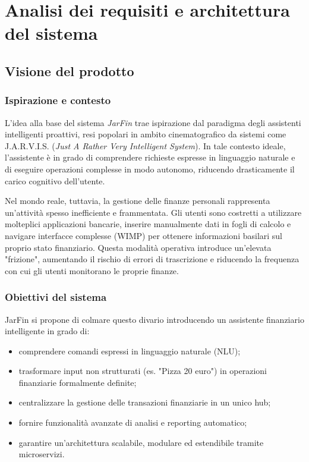 \chapter{Analisi dei requisiti e architettura del sistema}

\section{Visione del prodotto}

\subsection{Ispirazione e contesto}

L'idea alla base del sistema \textit{JarFin} trae ispirazione dal paradigma degli assistenti intelligenti proattivi, resi popolari in ambito cinematografico da sistemi come J.A.R.V.I.S. (\textit{Just A Rather Very Intelligent System}). In tale contesto ideale, l'assistente è in grado di comprendere richieste espresse in linguaggio naturale e di eseguire operazioni complesse in modo autonomo, riducendo drasticamente il carico cognitivo dell'utente.

Nel mondo reale, tuttavia, la gestione delle finanze personali rappresenta un'attività spesso inefficiente e frammentata. Gli utenti sono costretti a utilizzare molteplici applicazioni bancarie, inserire manualmente dati in fogli di calcolo e navigare interfacce complesse (WIMP) per ottenere informazioni basilari sul proprio stato finanziario.
Questa modalità operativa introduce un'elevata "frizione", aumentando il rischio di errori di trascrizione e riducendo la frequenza con cui gli utenti monitorano le proprie finanze.

\newpage
\subsection{Obiettivi del sistema}

JarFin si propone di colmare questo divario introducendo un assistente finanziario intelligente in grado di:
\begin{itemize}
    \item comprendere comandi espressi in linguaggio naturale (NLU);
    \item trasformare input non strutturati (es. "Pizza 20 euro") in operazioni finanziarie formalmente definite;
    \item centralizzare la gestione delle transazioni finanziarie in un unico hub;
    \item fornire funzionalità avanzate di analisi e reporting automatico;
    \item garantire un'architettura scalabile, modulare ed estendibile tramite microservizi.
\end{itemize}

